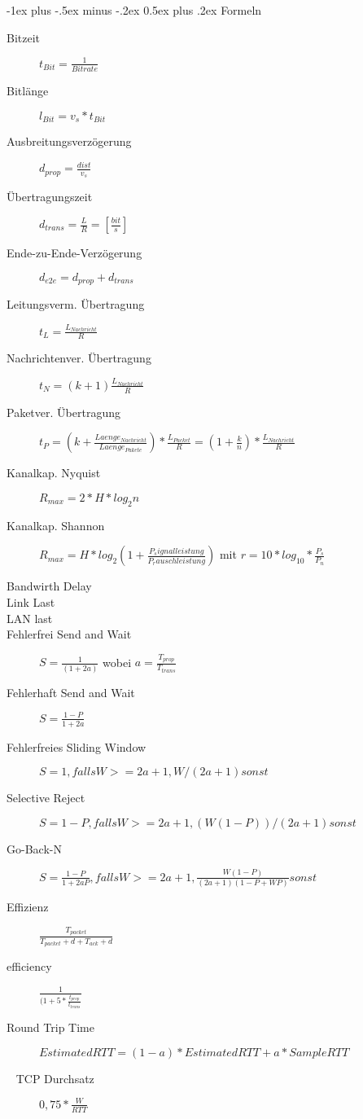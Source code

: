 \documentclass[10pt,landscape]{article}
\makeatletter
\renewcommand{\section}{\@startsection{section}{1}{0mm}%
                                {-1ex plus -.5ex minus -.2ex}%
                                {0.5ex plus .2ex}%
                                {\normalfont\large\bfseries}}
\makeatother
\begin{document}
\begin{multicols}{3}
\end{multicols}

\section{Formeln}
\begin{multicols}{2}
    \begin{description}
        \item[Bitzeit] $t_{Bit}=\frac{1}{Bitrate}$
        \item[Bitlänge] $l_{Bit}=v_s * t_{Bit}$
        \item[Ausbreitungsverzögerung]  $d_{prop} = \frac{dist}{v_s}$
        \item[Übertragungszeit] $d_{trans} = \frac{L}{R} = [\frac{bit}{s}]$
        \item[Ende-zu-Ende-Verzögerung] $d_{e2e} = d_{prop} + d_{trans}$
        \item[Leitungsverm. Übertragung] $t_L = \frac{L_{Nachricht}}{R}$
        \item[Nachrichtenver. Übertragung] $t_N = (k + 1)\frac{L_{Nachricht}}{R}$
        \item[Paketver. Übertragung] $t_{P} = (k + \frac{Laenge_{Nachricht}}{Laenge_{Pakete}})*\frac{L_{Packet}}{R} = (1+ \frac{k}{n})* \frac{L_{Nachricht}}{R}$
        \item[Kanalkap. Nyquist] $R_{max} = 2* H * log_2n$
        \item[Kanalkap. Shannon] $R_{max} = H*log_2(1+\frac{P_signalleistung}{P_rauschleistung})$ mit $r=10*log_{10}*{\frac{P_s}{P_n}}$
        \item[Bandwirth Delay]
        \item[Link Last]
        \item[LAN last]
        \item[Fehlerfrei Send and Wait] $S = \frac{1}{(1+2a)}$ wobei $a = \frac{T_{prop}}{T_{trans}}$
        \item[Fehlerhaft Send and Wait] $S = \frac{1-P}{1+2a}$
        \item[Fehlerfreies Sliding Window] $S = {1, falls W >= 2a+1, W/(2a+1) sonst}$
        \item[Selective Reject] $S = {1-P, falls W >= 2a+1, (W(1-P))/(2a+1) sonst}$
        \item[Go-Back-N] $S = {\frac{1-P}{1+2aP}, falls W >= 2a+1, \frac{W(1-P)}{(2a+1)(1-P+WP)} sonst}$
        \item[Effizienz] $\frac{T_{packet} }{ T_{packet} + d + T_{ack} + d}$
        \item[efficiency] $\frac{1}{ (1+ 5 * \frac{t_{prop}}{t_{trans}}}$
        \item[Round Trip Time] $EstimatedRTT = (1-a) * EstimatedRTT + a * SampleRTT$
        \item[~ TCP Durchsatz] $ 0,75 * \frac{W}{RTT}$
    \end{description}
\end{multicols}
\end{document}
